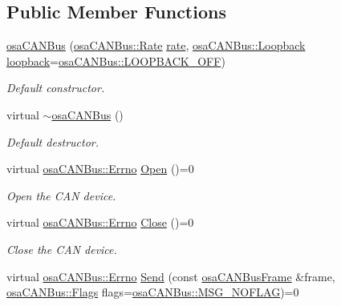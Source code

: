 \subsection*{Public Member Functions}
\begin{DoxyCompactItemize}
\item 
\hyperlink{classosa_c_a_n_bus_abe19d4eebf9d21dcc3f23eb245716a89}{osa\+C\+A\+N\+Bus} (\hyperlink{classosa_c_a_n_bus_ae977dbc0e1c16772395408c8e018fe6c}{osa\+C\+A\+N\+Bus\+::\+Rate} \hyperlink{classosa_c_a_n_bus_a4ff86a9ecf19161b1f34666888e0a331}{rate}, \hyperlink{classosa_c_a_n_bus_a992406c83a336e95fb4a09b0b13df786}{osa\+C\+A\+N\+Bus\+::\+Loopback} \hyperlink{classosa_c_a_n_bus_a724e9c478dd48908882e29f189d98968}{loopback}=\hyperlink{classosa_c_a_n_bus_a992406c83a336e95fb4a09b0b13df786ae2557509d0c1ac68029eeb6bdf6e703d}{osa\+C\+A\+N\+Bus\+::\+L\+O\+O\+P\+B\+A\+C\+K\+\_\+\+O\+F\+F})
\begin{DoxyCompactList}\small\item\em Default constructor. \end{DoxyCompactList}\item 
virtual \hyperlink{classosa_c_a_n_bus_a055aece68a45f1e8c8375c62eaaf8e0c}{$\sim$osa\+C\+A\+N\+Bus} ()
\begin{DoxyCompactList}\small\item\em Default destructor. \end{DoxyCompactList}\item 
virtual \hyperlink{classosa_c_a_n_bus_a6fa3e95ec4c36932d0640e40e0748fde}{osa\+C\+A\+N\+Bus\+::\+Errno} \hyperlink{classosa_c_a_n_bus_a3471574c0625ff4ec43b2fa8a3a020af}{Open} ()=0
\begin{DoxyCompactList}\small\item\em Open the C\+A\+N device. \end{DoxyCompactList}\item 
virtual \hyperlink{classosa_c_a_n_bus_a6fa3e95ec4c36932d0640e40e0748fde}{osa\+C\+A\+N\+Bus\+::\+Errno} \hyperlink{classosa_c_a_n_bus_aeabd3fe0c7db2c13978834f4bd2f08db}{Close} ()=0
\begin{DoxyCompactList}\small\item\em Close the C\+A\+N device. \end{DoxyCompactList}\item 
virtual \hyperlink{classosa_c_a_n_bus_a6fa3e95ec4c36932d0640e40e0748fde}{osa\+C\+A\+N\+Bus\+::\+Errno} \hyperlink{classosa_c_a_n_bus_a21b88fd2a857089845305d1e2eabb5b9}{Send} (const \hyperlink{classosa_c_a_n_bus_frame}{osa\+C\+A\+N\+Bus\+Frame} \&frame, \hyperlink{classosa_c_a_n_bus_a74fe35c6059237887431f3ccece7b21b}{osa\+C\+A\+N\+Bus\+::\+Flags} flags=\hyperlink{classosa_c_a_n_bus_a74fe35c6059237887431f3ccece7b21ba30f701fa6e0dba6e274540941ccd3978}{osa\+C\+A\+N\+Bus\+::\+M\+S\+G\+\_\+\+N\+O\+F\+L\+A\+G})=0

\end{DoxyCompactItemize}
